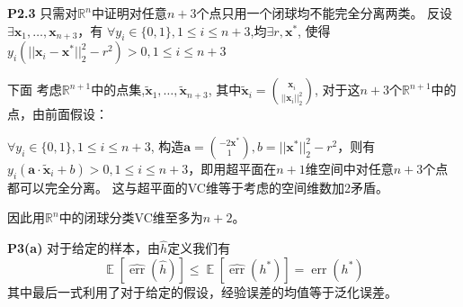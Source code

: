 \documentclass{ctexart}
\DeclareMathOperator*\E{\mathbb{E}}
\DeclareMathOperator\err{err}
\begin{document}
 \textbf{P2.3}
 只需对$\mathbb{R}^n$中证明对任意$n+3$个点只用一个闭球均不能完全分离两类。
 反设$\exists \bm{x}_1,\dots,\bm{x}_{n+3}$，有
 $\forall y_i \in \{0,1\},1\leq i\leq n+3$,均$\exists r,\bm{x}^*$,
 使得$y_i(||\bm{x}_i-\bm{x}^*||_2^2-r^2)>0,1\leq i\leq n+3$

 下面
考虑$\mathbb{R}^{n+1}$中的点集,$\tilde{\bm{x}}_1,\dots,\tilde{\bm{x}}_{n+3}$,
其中$\tilde{\bm{x}}_i=\binom{\bm{x}_i}{||\bm{x}_i||_2^2}$,
对于这$n+3$个$\mathbb{R}^{n+1}$中的点，由前面假设：

$\forall y_i \in \{0,1\},1\leq i\leq n+3$,
构造$\bm{a}=\binom{-2\bm{x}^*}{1},b=||\bm{x}^*||_2^2-r^2$，则有
$y_i(\bm{a}\cdot \tilde{\bm{x}}_i+b)>0,1\leq i\leq n+3$，即用超平面在$n+1$维空间中对任意$n+3$个点都可以完全分离。
这与超平面的VC维等于考虑的空间维数加2矛盾。

因此用$\mathbb{R}^n$中的闭球分类VC维至多为$n+2$。

\textbf{P3(a)}
对于给定的样本，由$\hat{h}$定义我们有
\begin{equation}
\E[\widehat{\err}(\hat{h})]\leq \E[\widehat{\err}(h^*)]=\err(h^*)
\end{equation}
其中最后一式利用了对于给定的假设，经验误差的均值等于泛化误差。
\end{document}
